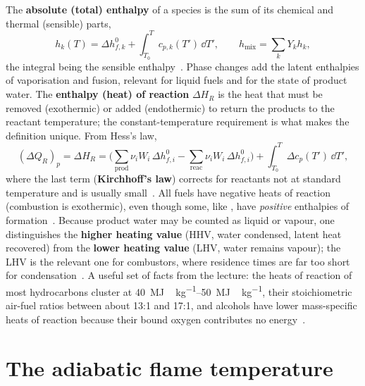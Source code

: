 The \textbf{absolute (total) enthalpy} of a species is the sum of its chemical and thermal (sensible) parts,
\begin{equation}
h_k(T)=\Delta h_{f,k}^0+\int_{T_0}^{T}c_{p,k}(T')\,\dd T',\qquad
h_{\mathrm{mix}}=\sum_k Y_k h_k ,
\label{eq:abs-enthalpy}
\end{equation}
the integral being the sensible enthalpy~\cite{lecture1,warnatz2006combustion}. Phase changes add the latent enthalpies of vaporisation and fusion, relevant for liquid fuels and for the state of product water. The \textbf{enthalpy (heat) of reaction} $\Delta H_R$ is the heat that must be removed (exothermic) or added (endothermic) to return the products to the reactant temperature; the constant-temperature requirement is what makes the definition unique. From Hess's law,
\begin{equation}
(\Delta Q_R)_p=\Delta H_R=\Big(\textstyle\sum_{\mathrm{prod}}\nu_i W_i\,\Delta h_{f,i}^0-\sum_{\mathrm{reac}}\nu_i W_i\,\Delta h_{f,i}^0\Big)+\int_{T_0}^{T}\Delta c_p(T')\,\dd T',
\label{eq:heat-reaction}
\end{equation}
where the last term (\textbf{Kirchhoff's law}) corrects for reactants not at standard temperature and is usually small~\cite{lecture1,Langella_LectureNotes,glassman2014combustion}. All fuels have negative heats of reaction (combustion is exothermic), even though some, like , have \emph{positive} enthalpies of formation~\cite{lecture1}. Because product water may be counted as liquid or vapour, one distinguishes the \textbf{higher heating value} (HHV, water condensed, latent heat recovered) from the \textbf{lower heating value} (LHV, water remains vapour); the LHV is the relevant one for combustors, where residence times are far too short for condensation~\cite{Langella_LectureNotes,glassman2014combustion}. A useful set of facts from the lecture: the heats of reaction of most hydrocarbons cluster at \SIrange{40}{50}{MJ\,kg^{-1}}, their stoichiometric air-fuel ratios between about 13:1 and 17:1, and alcohols have lower mass-specific heats of reaction because their bound oxygen contributes no energy~\cite{lecture1}.

\section{The adiabatic flame temperature}

